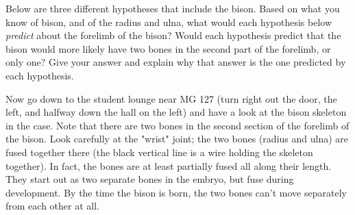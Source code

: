 \documentclass[12pt, addpoints, hidelinks]{exam}
\newcommand*\AnswerBox[2]{%
    \parbox[t][#1]{0.92\textwidth}{%
    \begin{solution}#2\end{solution}}
}
\begin{document}
\begin{questions}

\question[3]
Below are three different hypotheses that include the bison. Based 
on what you know of bison, and of the radius and ulna,
what would each hypothesis below \emph{predict} about the forelimb of
the bison? Would each hypothesis predict that the bison would more
likely have two bones in the second part of the forelimb, or only one?
Give your answer and explain why that answer is the one predicted by
each hypothesis.


\newpage

Now go down to the student lounge near MG 127 (turn right out the door, 
the left, and halfway down the hall on the left) and have a look at the bison
skeleton in the case. Note that there are two bones in the second section 
of the forelimb of the bison. Look carefully at the "wrist" joint; the two bones 
(radius and ulna) are fused together there (the black vertical line is a wire holding the
skeleton together). In fact, the bones are at least partially fused all
along their length. They start out as two separate bones in the embryo,
but fuse during development. By the time the bison is born, the two
bones can't move separately from each other at all.


\end{questions}
\end{document}
